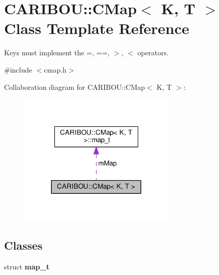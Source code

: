 \section{C\-A\-R\-I\-B\-O\-U\-:\-:C\-Map$<$ K, T $>$ Class Template Reference}
\label{class_c_a_r_i_b_o_u_1_1_c_map}


Keys must implement the =, ==, $>$, $<$ operators.  




{\ttfamily \#include $<$cmap.\-h$>$}



Collaboration diagram for C\-A\-R\-I\-B\-O\-U\-:\-:C\-Map$<$ K, T $>$\-:\nopagebreak
\begin{figure}[H]
\begin{center}
\leavevmode
\includegraphics[width=212pt]{class_c_a_r_i_b_o_u_1_1_c_map__coll__graph}
\end{center}
\end{figure}
\subsection*{Classes}
\begin{DoxyCompactItemize}
\item 
struct {\bf map\-\_\-t}
\end{DoxyCompactItemize}
